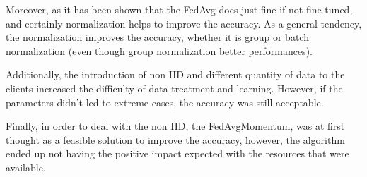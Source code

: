 \documentclass[twocolumn]{article}
\begin{document}
Moreover, as it has been shown that the FedAvg does just fine if not fine tuned, and certainly normalization helps to improve the accuracy. As a general tendency, the normalization improves the  accuracy, whether it is group or batch normalization (even though group normalization better performances). 

Additionally, the introduction of non IID and different quantity of data to the clients increased the difficulty of data treatment and learning. However, if the parameters didn't led to extreme cases, the accuracy was still acceptable.

Finally, in order to deal with the non IID, the FedAvgMomentum, was at first thought as a feasible solution to improve the accuracy, however, the algorithm ended up not having the positive impact expected with the resources that were available.

\printbibliography
\end{document}
